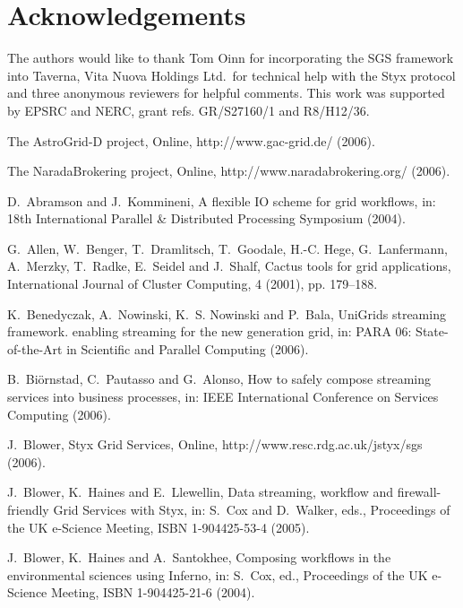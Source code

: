 \documentclass[a4paper]{article}
\begin{document}
\section*{Acknowledgements}
The authors would like to thank Tom Oinn for incorporating the SGS framework into Taverna, Vita Nuova Holdings Ltd.\ for technical help with the Styx protocol and three anonymous reviewers for helpful comments.  This work was supported by EPSRC and NERC, grant refs. GR/S27160/1 and R8/H12/36.



\begin{thebibliography}{10}
\providecommand{\url}[1]{\texttt{#1}}
\providecommand{\urlprefix}{URL }

The {A}stro{G}rid-{D} project, Online, http://www.gac-grid.de/ (2006).

The {N}arada{B}rokering project, Online, http://www.naradabrokering.org/
  (2006).

D.~Abramson and J.~Kommineni, A flexible {IO} scheme for grid workflows, in:
  18th International Parallel \& Distributed Processing Symposium (2004).

G.~Allen, W.~Benger, T.~Dramlitsch, T.~Goodale, H.-C. Hege, G.~Lanfermann,
  A.~Merzky, T.~Radke, E.~Seidel and J.~Shalf, Cactus tools for grid
  applications, International Journal of Cluster Computing, 4 (2001), pp.
  179--188.

K.~Benedyczak, A.~Nowinski, K.~S. Nowinski and P.~Bala, Uni{G}rids streaming
  framework. enabling streaming for the new generation grid, in: PARA 06:
  State-of-the-Art in Scientific and Parallel Computing (2006).

B.~Bi\"{o}rnstad, C.~Pautasso and G.~Alonso, How to safely compose streaming
  services into business processes, in: IEEE International Conference on
  Services Computing (2006).

J.~Blower, {S}tyx {G}rid {S}ervices, Online,
  http://www.resc.rdg.ac.uk/jstyx/sgs (2006).

J.~Blower, K.~Haines and E.~Llewellin, Data streaming, workflow and
  firewall-friendly {G}rid {S}ervices with {S}tyx, in: S.~Cox and D.~Walker,
  eds., Proceedings of the UK e-Science Meeting, {ISBN} 1-904425-53-4 (2005).

J.~Blower, K.~Haines and A.~Santokhee, {C}omposing workflows in the
  environmental sciences using {I}nferno, in: S.~Cox, ed., Proceedings of the
  UK e-Science Meeting, {ISBN} 1-904425-21-6 (2004).


\end{thebibliography}
\end{document}
